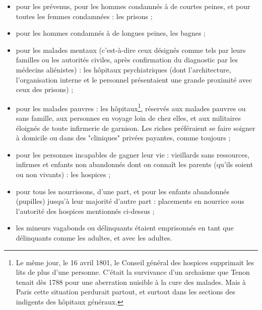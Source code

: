\begin{itemize}
\item pour les prévenus, pour les hommes condamnés à de courtes peines, et pour toutes les femmes condamnées : les prisons ; 
\item pour les hommes condamnés à de longues peines, les bagnes ;
\item pour les malades mentaux (c'est-à-dire ceux désignés comme tels par leurs familles ou les autorités civiles, après confirmation du diagnostic par les médecins aliénistes) : les hôpitaux psychiatriques (dont l'architecture, l'organisation interne et le personnel présentaient une grande proximité avec ceux des prisons) ;
\item pour les malades pauvres : les hôpitaux\footnote{Le même jour, le 16 avril 1801, le Conseil général des hospices supprimait les lits de plus d'une personne. C'était la survivance d'un archaïsme que Tenon tenait dès 1788 pour une aberration nuisible à la cure des malades. Mais à Paris cette situation perdurait partout, et surtout dans les sections des indigents des hôpitaux généraux.}, réservés aux malades pauvres ou sans famille, aux personnes en voyage loin de chez elles, et aux militaires éloignés de toute infirmerie de garnison. Les riches préféraient se faire soigner à domicile ou dans des "cliniques" privées payantes, comme toujours ;
\item pour les personnes incapables de gagner leur vie : vieillards sans ressources, infirmes et enfants non abandonnés dont on connaît les parents (qu'ils soient ou non vivants) : les hospices ;
\item pour tous les nourrissons, d'une part, et pour les enfants abandonnés (pupilles) jusqu'à leur majorité d'autre part : placements en nourrice sous l'autorité des hospices mentionnés ci-dessus ;
\item les mineurs vagabonds ou délinquants étaient emprisonnés en tant que délinquants comme les adultes, et avec les adultes. 
 \end{itemize}

 


